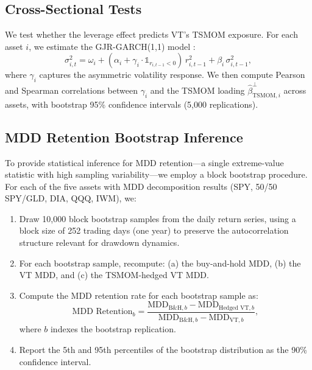 \subsection{Cross-Sectional Tests}

We test whether the leverage effect predicts VT's TSMOM exposure. For each asset $i$, we estimate the GJR-GARCH(1,1) model \citep{glosten1993}:
\begin{equation}
\sigma_{i,t}^2 = \omega_i + (\alpha_i + \gamma_i \cdot \mathbb{1}_{r_{i,t-1}<0}) \, r_{i,t-1}^2 + \beta_i \, \sigma_{i,t-1}^2,
\label{eq:gjr}
\end{equation}
where $\gamma_i$ captures the asymmetric volatility response. We then compute Pearson and Spearman correlations between $\gamma_i$ and the TSMOM loading $\hat{\beta}_{\text{TSMOM},i}^{\perp}$ across assets, with bootstrap 95\% confidence intervals (5,000 replications).

\subsection{MDD Retention Bootstrap Inference}

To provide statistical inference for MDD retention---a single extreme-value statistic with high sampling variability---we employ a block bootstrap procedure. For each of the five assets with MDD decomposition results (SPY, 50/50 SPY/GLD, DIA, QQQ, IWM), we:

\begin{enumerate}
\item Draw 10,000 block bootstrap samples from the daily return series, using a block size of 252 trading days (one year) to preserve the autocorrelation structure relevant for drawdown dynamics.
\item For each bootstrap sample, recompute: (a) the buy-and-hold MDD, (b) the VT MDD, and (c) the TSMOM-hedged VT MDD.
\item Compute the MDD retention rate for each bootstrap sample as:
\begin{equation}
\text{MDD Retention}_b = \frac{\text{MDD}_{\text{B\&H},b} - \text{MDD}_{\text{Hedged VT},b}}{\text{MDD}_{\text{B\&H},b} - \text{MDD}_{\text{VT},b}},
\label{eq:mdd_retention_boot}
\end{equation}
where $b$ indexes the bootstrap replication.
\item Report the 5th and 95th percentiles of the bootstrap distribution as the 90\% confidence interval.
\end{enumerate}

